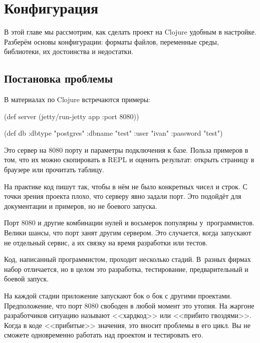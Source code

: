\chapter{Конфигурация}


\label{chapter-config}

\begin{teaser}
В этой главе мы рассмотрим, как сделать проект на Clojure удобным в
настройке. Разберём основы конфигурации: форматы файлов, переменные среды,
библиотеки, их достоинства и недостатки.
\end{teaser}

\section{Постановка проблемы}

В материалах по Clojure встречаются примеры:

\begin{english}
  \begin{clojure}
(def server
  (jetty/run-jetty app {:port 8080}))

(def db {:dbtype   "postgres"
         :dbname   "test"
         :user     "ivan"
         :password "test"})
  \end{clojure}
\end{english}

Это сервер на 8080 порту и параметры подключения к базе. Польза примеров в том,
что их можно скопировать в REPL и оценить результат: открыть страницу в браузере
или прочитать таблицу.

На практике код пишут так, чтобы в нём не было конкретных чисел и строк. С точки
зрения проекта плохо, что серверу явно задали порт. Это подойдёт для
документации и примеров, но не боевого запуска.

Порт 8080 и другие комбинации нулей и восьмерок популярны
у~программистов. Велики шансы, что порт занят другим сервером. Это случается,
когда запускают не отдельный сервис, а их связку на время разработки или тестов.

Код, написанный программистом, проходит несколько стадий. В~разных фирмах набор
отличается, но в целом это разработка, тестирование, предварительный и боевой
запуск.


На каждой стадии приложение запускают бок о бок с другими
проектами. Предположение, что порт 8080 свободен в любой момент это утопия. На
жаргоне разработчиков ситуацию называют <<хардкод>>  или <<прибито
гвоздями>>. Когда в коде <<прибитые>> значения, это вносит проблемы в его
цикл. Вы не сможете одновременно работать над проектом и тестировать его.

